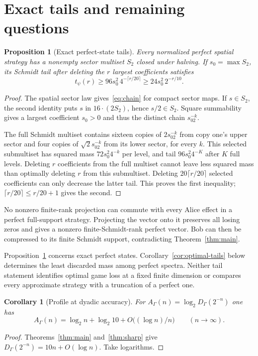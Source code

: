 \documentclass[11pt]{article}
\newtheorem{proposition}[theorem]{Proposition}
\newtheorem{corollary}[theorem]{Corollary}
\theoremstyle{definition}
\newcommand{\mult}[2]{#1\mathbin{\cdot}#2}
\begin{document}
\section{Exact tails and remaining questions}\label{sec:profile}
\begin{proposition}[Exact perfect-state tails]\label{prop:tails}
Every normalized perfect spatial strategy has a nonempty sector multiset $S_2$ closed under halving. If $s_0=\max S_2$, its Schmidt tail after deleting the $r$ largest coefficients satisfies
\begin{equation}\label{eq:taillower}
t_\psi(r)\geq96s_0^2\,4^{-\lceil r/20\rceil}
\geq24s_0^2\,2^{-r/10}.
\end{equation}
\end{proposition}
\begin{proof}
The spatial sector law gives~\eqref{eq:chain} for compact sector maps. If $s\in S_2$, the second identity puts $s$ in $\mult{16}{(2S_2)}$, hence $s/2\in S_2$. Square summability gives a largest coefficient $s_0>0$ and thus the distinct chain $s_02^{-k}$.

The full Schmidt multiset contains sixteen copies of $2s_02^{-k}$ from copy one's upper sector and four copies of $\sqrt2s_02^{-k}$ from its lower sector, for every $k$. This selected submultiset has squared mass $72s_0^2 4^{-k}$ per level, and tail $96s_0^2 4^{-K}$ after $K$ full levels. Deleting $r$ coefficients from the full multiset cannot leave less squared mass than optimally deleting $r$ from this submultiset. Deleting $20\lceil r/20\rceil$ selected coefficients can only decrease the latter tail. This proves the first inequality; $\lceil r/20\rceil\leq r/20+1$ gives the second.
\end{proof}

No nonzero finite-rank projection can commute with every Alice effect in a perfect full-support strategy. Projecting the vector onto it preserves all losing zeros and gives a nonzero finite-Schmidt-rank perfect vector. Bob can then be compressed to its finite Schmidt support, contradicting Theorem~\ref{thm:main}.

Proposition~\ref{prop:tails} concerns exact perfect states. Corollary~\ref{cor:optimal-tails} below determines the least discarded mass among perfect spectra. Neither tail statement identifies optimal game loss at a fixed finite dimension or compares every approximate strategy with a truncation of a perfect one.

\begin{corollary}[Profile at dyadic accuracy]\label{cor:profile}
For $A_\Gamma(n)=\log_2D_\Gamma(2^{-n})$ one has
\[
A_\Gamma(n)=\log_2 n+\log_2 10+O\bigl((\log n)/n\bigr)
\qquad(n\to\infty).
\]
\end{corollary}
\begin{proof}
Theorems~\ref{thm:main} and~\ref{thm:sharp} give
$D_\Gamma(2^{-n})=10n+O(\log n)$. Take logarithms.
\end{proof}
\end{document}
